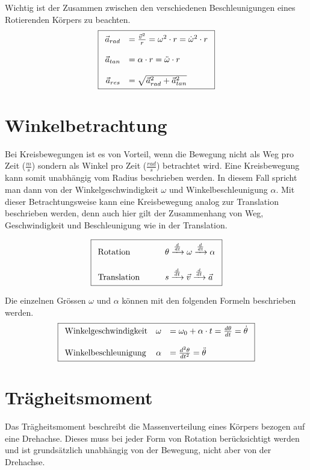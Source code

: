 \noindent
Wichtig ist der Zusammen zwischen den verschiedenen Beschleunigungen
eines Rotierenden Körpers zu beachten.
\[ \boxed{\begin{array}{r l}
	\vec{a}_{rad} & = \frac{\vec{v}^2}{r} 
		= \omega^2 \cdot r 
		= \dot{\omega}^2 \cdot r \\
	& \\
	\vec{a}_{tan} & = \alpha \cdot r
		= \ddot{\omega} \cdot r \\
	& \\
	\vec{a}_{res} & = \sqrt{\vec{a}_{rad}^2 + \vec{a}_{tan}^2} 
\end{array} }\]

\section{Winkelbetrachtung}\label{sec:winkelbetrachtung}
Bei Kreisbewegungen ist es von Vorteil, wenn die Bewegung nicht als
Weg pro Zeit ($\frac{m}{s}$) sondern als Winkel pro Zeit 
($\frac{rad}{s}$) betrachtet wird. Eine Kreisbewegung kann somit 
unabhängig vom Radius beschrieben werden. In diesem Fall spricht
man dann von der Winkelgeschwindigkeit $\omega$ und 
Winkelbeschleunigung $\alpha$. Mit dieser Betrachtungsweise kann
eine Kreisbewegung analog zur Translation beschrieben werden, denn
auch hier gilt der Zusammenhang von Weg, Geschwindigkeit und 
Beschleunigung wie in der Translation.

\[ \boxed{ \begin{array}{l l}
	\text{Rotation} \qquad &
		\theta
		\xrightarrow{\frac{d}{dt}} \omega 
		\xrightarrow{\frac{d}{dt}} \alpha \\
	& \\
	\text{Translation} \qquad &
		s
		\xrightarrow{\frac{d}{dt}} \vec{v} 
		\xrightarrow{\frac{d}{dt}} \vec{a}
\end{array} }\]

\noindent
Die einzelnen Grössen $\omega$ und $\alpha$ können mit den folgenden 
Formeln beschrieben werden.
\[ \boxed{\begin{array}{l r l}
	\text{Winkelgeschwindigkeit} &
		\omega & = \omega_0 + \alpha \cdot t 
			= \frac{d\theta}{dt} 
			= \dot{\theta} \\
	& & \\
	\text{Winkelbeschleunigung} &
		\alpha & = \frac{d^2\theta}{dt^2} = \ddot{\theta}
\end{array} }\]

\section{Trägheitsmoment}
Das Trägheitsmoment beschreibt die Massenverteilung eines Körpers
bezogen auf eine Drehachse. Dieses muss bei jeder Form von Rotation
berücksichtigt werden und ist grundsätzlich unabhängig von der 
Bewegung, nicht aber von der Drehachse.

